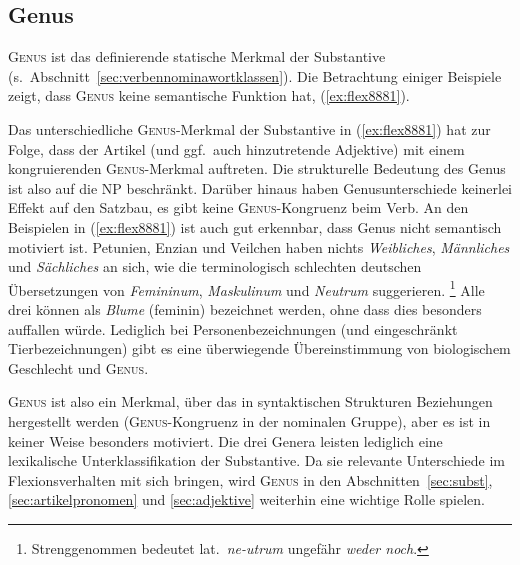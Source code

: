 \subsection{Genus}


\textsc{Genus} ist das definierende statische Merkmal der Substantive (s.\ Abschnitt~\ref{sec:verbennominawortklassen}).
Die Betrachtung einiger Beispiele zeigt, dass \textsc{Genus} keine semantische Funktion hat, (\ref{ex:flex8881}).

\begin{exe}
  \ex \label{ex:flex8881}
  \begin{xlist}
  \end{xlist}
\end{exe}

Das unterschiedliche \textsc{Genus}-Merkmal der Substantive in (\ref{ex:flex8881}) hat zur Folge, dass der Artikel (und ggf.\ auch hinzutretende Adjektive) mit einem kongruierenden \textsc{Genus}-Merkmal auftreten.
Die strukturelle Bedeutung des Genus ist also auf die NP beschränkt.
Darüber hinaus haben Genusunterschiede keinerlei Effekt auf den Satzbau, es gibt \zB keine \textsc{Genus}-Kongruenz beim Verb.
 An den Beispielen in (\ref{ex:flex8881}) ist auch gut erkennbar, dass Genus nicht semantisch motiviert ist.
Petunien, Enzian und Veilchen haben nichts \textit{Weibliches}, \textit{Männliches} und \textit{Sächliches} an sich, wie die terminologisch schlechten deutschen Übersetzungen von \textit{Femininum}, \textit{Maskulinum} und \textit{Neutrum} suggerieren.%
\footnote{Strenggenommen bedeutet lat.\ \textit{ne-utrum} ungefähr \textit{weder noch}.}
Alle drei können als \textit{Blume} (feminin) bezeichnet werden, ohne dass dies besonders auffallen würde.
Lediglich bei Personenbezeichnungen (und eingeschränkt Tierbezeichnungen) gibt es eine überwiegende Übereinstimmung von biologischem Geschlecht und \textsc{Genus}.

\textsc{Genus} ist also ein Merkmal, über das in syntaktischen Strukturen Beziehungen hergestellt werden (\textsc{Genus}-Kongruenz in der nominalen Gruppe), aber es ist in keiner Weise besonders motiviert.
Die drei Genera leisten lediglich eine lexikalische Unterklassifikation der Substantive.
Da sie relevante Unterschiede im Flexionsverhalten mit sich bringen, wird \textsc{Genus} in den Abschnitten~\ref{sec:subst}, \ref{sec:artikelpronomen} und \ref{sec:adjektive} weiterhin eine wichtige Rolle spielen.

